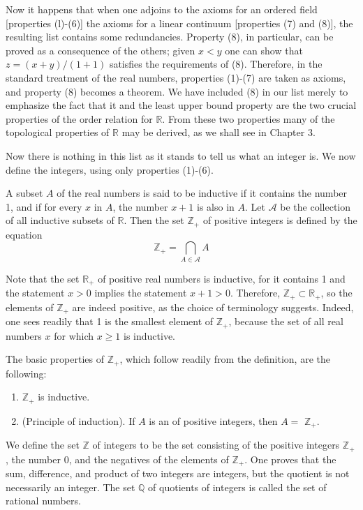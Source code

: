 Now it happens that when one adjoins to the axioms for an ordered field 
[properties (l)-(6)] the axioms for a linear continuum [properties (7) and (8)], 
the resulting list contains some redundancies. Property (8), in particular, 
can be proved as a consequence of the others; given \(x < y\) one can show 
that \(z = ({x + y}) /({1 + 1})\) satisfies the requirements of (8). 
Therefore, in the standard treatment of the real numbers, properties (1)-(7) 
are taken as axioms, and property (8) becomes a theorem. We have included (8) 
in our list merely to emphasize the fact that it and the least upper bound 
property are the two crucial properties of the order relation for 
\(\mathbb{R}\). From these two properties many of the topological properties 
of \(\mathbb{R}\) may be derived, as we shall see in Chapter 3.

Now there is nothing in this list as it stands to tell us what an integer is. 
We now define the integers, using only properties (1)-(6).

\begin{definition}
 A subset \(A\) of the real numbers is said to be inductive if it contains the number 1, and if for every \(x\) in \(A\), the number \(x + 1\) is also in \(A\). Let \(\mathcal{A}\) be the collection of all inductive subsets of \(\mathbb{R}\). Then the set \(\mathbb{Z}_{+}\) of positive integers is defined by the equation
 \[
 \mathbb{Z}_{+} = \mathop{\bigcap }\limits_{{A \in \mathcal{A}}}A
 \]
\end{definition}

Note that the set \(\mathbb{R}_{+}\) of positive real numbers is inductive, 
for it contains 1 and the statement \(x > 0\) implies the statement 
\(x + 1 > 0\). Therefore, \(\mathbb{Z}_{+} \subset {\mathbb{R}}_{+}\), 
so the elements of \(\mathbb{Z}_{+}\) are indeed positive, as the choice 
of terminology suggests. Indeed, one sees readily that 1 is the smallest 
element of \(\mathbb{Z}_{+}\), because the set of all real numbers \(x\) 
for which \(x \geq 1\) is inductive.

The basic properties of \(\mathbb{Z}_{+}\), which follow readily from the 
definition, are the following:

\begin{enumerate}[itemsep=0.2em, parsep=0pt, topsep=0pt, partopsep=0pt, leftmargin=*, label=(\arabic*), align=left]
\item \(\mathbb{Z}_{+}\) is inductive.

\item (Principle of induction). If \(A\) is an  of positive integers, then \(A =\) \(\mathbb{Z}_{+}\).
\end{enumerate}
We define the set \(\mathbb{Z}\) of integers to be the set consisting of the 
positive integers \(\mathbb{Z}_{+}\), the number 0, and the negatives of 
the elements of \(\mathbb{Z}_{+}\). One proves that the sum, difference, 
and product of two integers are integers, but the quotient is not necessarily 
an integer. The set \(\mathbb{Q}\) of quotients of integers is called the set 
of rational numbers.

